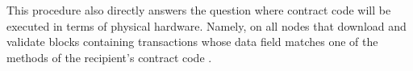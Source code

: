 This procedure also directly answers the question where contract code will be executed in terms of physical hardware. Namely, on all nodes that download and validate blocks containing transactions whose data field matches one of the methods of the recipient's contract code \cite[p.~24]{ethereumWhitepaperGitHub}.